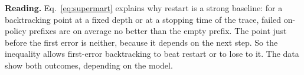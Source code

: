 \textbf{Reading.} Eq.~\ref{eq:supermart} explains why restart is a strong baseline: for a
backtracking point at a fixed depth or at a stopping time of the trace, failed on-policy prefixes
are on average no better than the empty prefix. The point just before the first error is neither,
because it depends on the next step. So the inequality allows first-error backtracking to beat
restart or to lose to it. The data show both outcomes, depending on the model.
